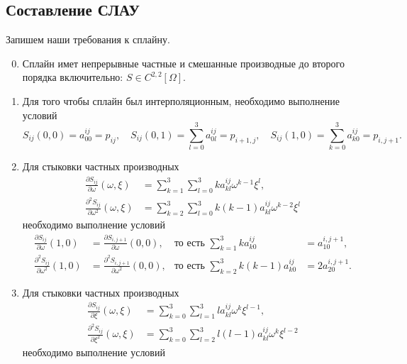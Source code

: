 \documentclass[12pt]{article}
\begin{document}
\subsection*{Составление СЛАУ}
Запишем наши требования к сплайну.
\begin{enumerate}
  \setcounter{enumi}{-1}
  \item Сплайн имет непрерывные частные и смешанные производные до второго
    порядка включительно: $ S \in C^{2,2}[\Omega] $.
  \item Для того чтобы сплайн был интерполяционным, необходимо выполнение
    условий
    \[
      S_{ij}(0, 0) = a_{00}^{ij} = p_{ij}, \quad
      S_{ij}(0, 1) = \sum_{l=0}^3 a_{0l}^{ij} = p_{i+1,j}, \quad
      S_{ij}(1, 0) = \sum_{k=0}^3 a_{k0}^{ij} = p_{i, j+1}.
    \]
  \item Для стыковки частных производных  
  \begin{align*}
    \frac{\partial S_{ij}}{\partial \omega}(\omega, \xi) &=
    \sum_{k=1}^3\sum_{l=0}^3 k a_{kl}^{ij}\omega^{k-1}\xi^l,\\
    \frac{\partial^2 S_{ij}}{\partial \omega^2}(\omega, \xi) &=
    \sum_{k=2}^3\sum_{l=0}^3 k(k-1)a_{kl}^{ij}\omega^{k-2}\xi^l
  \end{align*}
  необходимо выполнение условий
  \begin{align*}
    \frac{\partial S_{ij}}{\partial \omega}(1, 0) &=  \frac{\partial S_{i, j+1}}{\partial
    \omega}(0,0), & \text{то есть }\sum_{k=1}^3 ka^{ij}_{k0} &= a_{10}^{i,j+1},\\   
    \frac{\partial^2 S_{ij}}{\partial \omega^2}(1, 0) &=  \frac{\partial^2 S_{i,
    j+1}}{\partial
      \omega^2}(0,0), & \text{то есть }\sum_{k=2}^3
      k(k-1)a_{k0}^{ij} &= 2a^{i,j+1}_{20}.
  \end{align*}
\item Для стыковки частных производных  
\begin{align*}
  \frac{\partial S_{ij}}{\partial \xi}(\omega, \xi) &=
  \sum_{k=0}^3\sum_{l=1}^3 l a_{kl}^{ij}\omega^{k}\xi^{l-1},\\
  \frac{\partial^2 S_{ij}}{\partial \xi^2}(\omega, \xi) &=
  \sum_{k=0}^3\sum_{l=2}^3 l(l-1) a_{kl}^{ij}\omega^{k}\xi^{l-2}
\end{align*}
необходимо выполнение условий
  \begin{align*}

\end{align*}
\end{enumerate}
\end{document}
